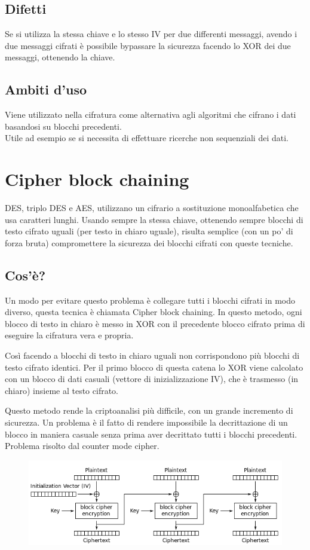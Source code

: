 \subsection{Difetti}
Se si utilizza la stessa chiave e lo stesso IV per due differenti messaggi, avendo i due messaggi cifrati è possibile bypassare la sicurezza facendo lo XOR dei due messaggi, ottenendo la chiave.

\subsection{Ambiti d'uso}
Viene utilizzato nella cifratura come alternativa agli algoritmi che cifrano i dati basandosi su blocchi precedenti.\\
Utile ad esempio se si necessita di effettuare ricerche non sequenziali dei dati.

\section{Cipher block chaining}

DES, triplo DES e AES, utilizzano un cifrario a sostituzione monoalfabetica che usa caratteri lunghi. Usando sempre la stessa chiave, ottenendo sempre blocchi di testo cifrato uguali (per testo in chiaro uguale), risulta semplice (con un po’ di forza bruta) compromettere la sicurezza dei blocchi cifrati con queste tecniche.
\subsection{Cos'è?}
Un modo per evitare questo problema è collegare tutti i blocchi cifrati in modo diverso, questa tecnica è chiamata Cipher block chaining.
In questo metodo, ogni blocco di testo in chiaro è messo in XOR con il precedente blocco cifrato prima di eseguire la cifratura vera e propria.

Così facendo a blocchi di testo in chiaro uguali non corrispondono più blocchi di testo cifrato identici. Per il primo blocco di questa catena lo XOR viene calcolato con un blocco di dati casuali (vettore di inizializzazione IV), che è trasmesso (in chiaro) insieme al testo cifrato.

Questo metodo rende la criptoanalisi più difficile, con un grande incremento di sicurezza. Un problema è il fatto di rendere impossibile la decrittazione di un blocco in maniera casuale senza prima aver decrittato tutti i blocchi precedenti. Problema risolto dal counter mode cipher.

\begin{figure}[H]
\centering
\includegraphics[scale=0.7]{res/img/55_CBC.png}
\end{figure}

